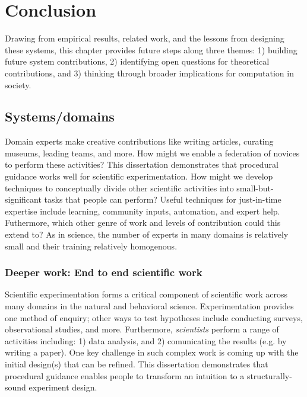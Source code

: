 
\chapter{Conclusion}
Drawing from empirical results, related work, and the lessons from designing these systems, this chapter provides future steps along three themes: 1) building future system contributions, 2) identifying open questions for theoretical contributions, and 3) thinking through broader implications for computation in society.

\section{Systems/domains} 

Domain experts make creative contributions like writing articles, curating museums, leading teams, and more. How might we enable a federation of novices to perform these activities? This dissertation demonstrates that procedural guidance works well for scientific experimentation. How might we develop techniques to conceptually divide other scientific activities into small-but-significant tasks that people can perform? Useful techniques for just-in-time expertise include learning, community inputs, automation, and expert help. Futhermore, which other genre of work and levels of contribution could this extend to? As in science, the number of experts in many domains is relatively small and their training relatively homogenous. 

\subsection{Deeper work: End to end scientific work}
Scientific experimentation forms a critical component of scientific work across many domains in the natural and behavioral science. Experimentation provides one method of enquiry; other ways to test hypotheses include conducting surveys, observational studies, and more. Furthermore, \textit{scientists} perform a range of activities including: 1) data analysis, and 2) comunicating the results (e.g. by writing a paper). One key challenge in such complex work is coming up with the initial design(s) that can be refined. This dissertation demonstrates that procedural guidance enables people to transform an intuition to a structurally-sound experiment design.


